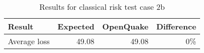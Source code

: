 \begin{table}[htbp]

\centering
\begin{tabular}{ l r r r }

\hline
\rowcolor{anti-flashwhite}
\bf{Result} & \bf{Expected} & \bf{OpenQuake} & \bf{Difference}\\
\hline
Average loss & 49.08 & 49.08 & 0\% \\
\hline
\end{tabular}

\caption{Results for classical risk test case 2b}
\label{tab:result-cr-2b}
\end{table}